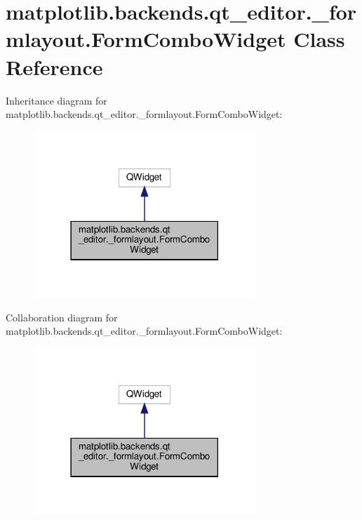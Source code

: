 \hypertarget{classmatplotlib_1_1backends_1_1qt__editor_1_1__formlayout_1_1FormComboWidget}{}\section{matplotlib.\+backends.\+qt\+\_\+editor.\+\_\+formlayout.\+Form\+Combo\+Widget Class Reference}
\label{classmatplotlib_1_1backends_1_1qt__editor_1_1__formlayout_1_1FormComboWidget}


Inheritance diagram for matplotlib.\+backends.\+qt\+\_\+editor.\+\_\+formlayout.\+Form\+Combo\+Widget\+:
\nopagebreak
\begin{figure}[H]
\begin{center}
\leavevmode
\includegraphics[width=237pt]{classmatplotlib_1_1backends_1_1qt__editor_1_1__formlayout_1_1FormComboWidget__inherit__graph}
\end{center}
\end{figure}


Collaboration diagram for matplotlib.\+backends.\+qt\+\_\+editor.\+\_\+formlayout.\+Form\+Combo\+Widget\+:
\nopagebreak
\begin{figure}[H]
\begin{center}
\leavevmode
\includegraphics[width=237pt]{classmatplotlib_1_1backends_1_1qt__editor_1_1__formlayout_1_1FormComboWidget__coll__graph}
\end{center}
\end{figure}
